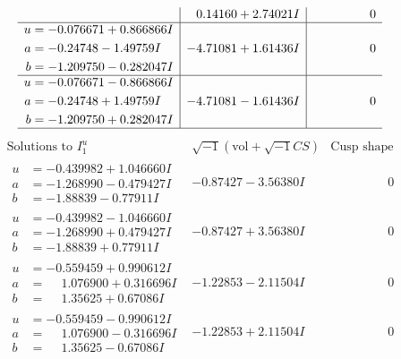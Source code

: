\documentclass[1p]{elsarticle_modified}
\theoremstyle{definition}
\newcommand{\I}{\sqrt{-1}}
\begin{document}
$$\begin{array}{c|c|c}
 & \phantom{-}0.14160 + 2.74021 I & \phantom{-0.000000 } 0 \\ \hline\begin{aligned}
u &= -0.076671 + 0.866866 I \\
a &= -0.24748 - 1.49759 I \\
b &= -1.209750 - 0.282047 I\end{aligned}
 & -4.71081 + 1.61436 I & \phantom{-0.000000 } 0 \\ \hline\begin{aligned}
u &= -0.076671 - 0.866866 I \\
a &= -0.24748 + 1.49759 I \\
b &= -1.209750 + 0.282047 I\end{aligned}
 & -4.71081 - 1.61436 I & \phantom{-0.000000 } 0\\
 \hline 
 \end{array}$$\newpage$$\begin{array}{c|c|c}  
\text{Solutions to }I^u_{1}& \I (\text{vol} + \sqrt{-1}CS) & \text{Cusp shape}\\
 \hline 
\begin{aligned}
u &= -0.439982 + 1.046660 I \\
a &= -1.268990 - 0.479427 I \\
b &= -1.88839 - 0.77911 I\end{aligned}
 & -0.87427 - 3.56380 I & \phantom{-0.000000 } 0 \\ \hline\begin{aligned}
u &= -0.439982 - 1.046660 I \\
a &= -1.268990 + 0.479427 I \\
b &= -1.88839 + 0.77911 I\end{aligned}
 & -0.87427 + 3.56380 I & \phantom{-0.000000 } 0 \\ \hline\begin{aligned}
u &= -0.559459 + 0.990612 I \\
a &= \phantom{-}1.076900 + 0.316696 I \\
b &= \phantom{-}1.35625 + 0.67086 I\end{aligned}
 & -1.22853 - 2.11504 I & \phantom{-0.000000 } 0 \\ \hline\begin{aligned}
u &= -0.559459 - 0.990612 I \\
a &= \phantom{-}1.076900 - 0.316696 I \\
b &= \phantom{-}1.35625 - 0.67086 I\end{aligned}
 & -1.22853 + 2.11504 I & \phantom{-0.000000 } 0 \\ \hline\begin{aligned}

\end{aligned}
\end{array}$$
\end{document}
